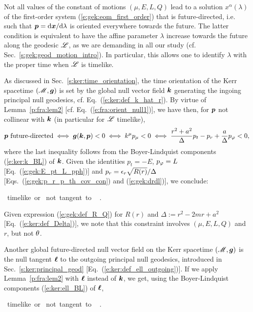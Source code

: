 Not all values of the constant of motions $(\mu,E,L,Q)$ lead to a solution
$x^\alpha(\lambda)$ of the first-order system (\ref{e:gek:eom_first_order})
that is future-directed, i.e. such that $\bm{p} = \mathrm{d} \bm{x}/\mathrm{d}\lambda$
is oriented everywhere towards the future.
The latter condition is equivalent to have the affine parameter $\lambda$ increase
towards the future along the geodesic $\mathscr{L}$, as we are demanding in all
our study (cf. Sec.~\ref{s:gek:geod_motion_intro}).
In particular, this allows one to identify $\lambda$ with the proper
time when $\mathscr{L}$ is timelike.


As discussed in Sec.~\ref{s:ker:time_orientation}, the time orientation of
the Kerr spacetime $(\mathscr{M},\bm{g})$ is set by the global null
vector field $\bm{k}$ generating the ingoing principal null geodesics, cf. Eq.~(\ref{e:ker:def_k_hat_r}).
By virtue of Lemma~\ref{p:fra:lem2}
[cf. Eq.~(\ref{e:fra:orient_null1})], we have then, for $\bm{p}$ not collinear
with $\bm{k}$ (in particular for $\mathscr{L}$ timelike),
\[
    \bm{p} \ \mbox{future-directed} \iff \bm{g}(\bm{k},\bm{p}) < 0
    \iff k^\mu p_\mu < 0
    \iff \frac{r^2 + a^2}{\Delta} p_t - p_r + \frac{a}{\Delta} p_\varphi < 0 ,
\]
where the last inequality follows from the Boyer-Lindquist components
(\ref{e:ker:k_BL}) of $\bm{k}$.
Given the identities $p_t = -E$, $p_\varphi = L$
[Eq.~(\ref{e:gek:E_pt_L_pph})] and $p_r = \epsilon_r \sqrt{R(r)}/ \Delta $
[Eqs.~(\ref{e:gek:p_r_p_th_cov_con})
and (\ref{e:gek:drdl})], we conclude:
\begin{tprop}{}{}
\be \label{e:gek:future_directed}
{\Li \ \mbox{timelike or}\atop
{} \ \mbox{not tangent to} \ \Li} \implies
{} .
\ee
\end{tprop}
Given expression (\ref{e:gek:def_R_Q}) for $R(r)$ and
$\Delta := r^2 - 2m r + a^2$ [Eq.~(\ref{e:ker:def_Delta})],
we note that this constraint involves $(\mu,E,L,Q)$ and $r$, but not $\theta$.

Another global future-directed null vector field on the Kerr spacetime $(\mathscr{M},\bm{g})$ is the null tangent
$\bm{\ell}$ to the outgoing principal null geodesics, introduced in Sec.~\ref{s:ker:principal_geod} [Eq.~(\ref{e:ker:def_ell_outgoing})]. If we apply Lemma~\ref{p:fra:lem2}  with $\bm{\ell}$ instead
of $\bm{k}$, we get, using the Boyer-Lindquist components (\ref{e:ker:ell_BL}) of $\bm{\ell}$,
\begin{tprop}{}{}
\be \label{e:gek:future_directed_l}
{\Li \ \mbox{timelike or}\atop
\wl \ \mbox{not tangent to} \ \Li} \implies
{} .
\ee
\end{tprop}

